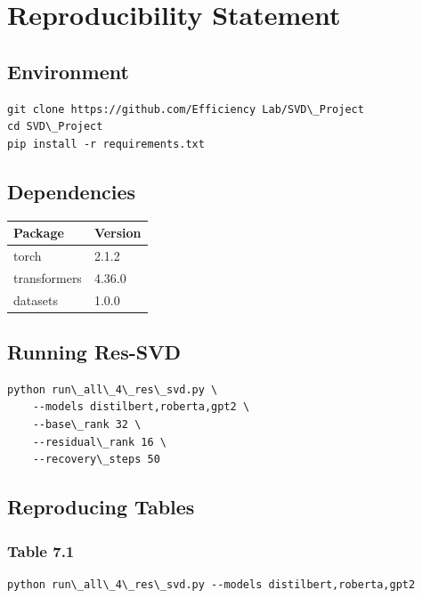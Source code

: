 \section{Reproducibility Statement}

\subsection{Environment}

\begin{lstlisting}
git clone https://github.com/Efficiency Lab/SVD\_Project
cd SVD\_Project
pip install -r requirements.txt
\end{lstlisting}

\subsection{Dependencies}

\begin{table}[H]
\centering
\small
\begin{tabular}{ll}
\toprule
\textbf{Package} & \textbf{Version} \\
\midrule
torch & 2.1.2 \\
transformers & 4.36.0 \\
datasets & 1.0.0 \\
\bottomrule
\end{tabular}
\end{table}

\subsection{Running Res-SVD}

\begin{lstlisting}
python run\_all\_4\_res\_svd.py \
    --models distilbert,roberta,gpt2 \
    --base\_rank 32 \
    --residual\_rank 16 \
    --recovery\_steps 50
\end{lstlisting}

\subsection{Reproducing Tables}

\subsubsection{Table 7.1}
\begin{lstlisting}
python run\_all\_4\_res\_svd.py --models distilbert,roberta,gpt2
\end{lstlisting}

